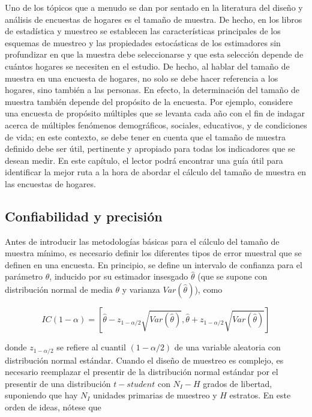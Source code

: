 \documentclass[
  12pt,
  spanish,
]{book}
\begin{document}
Uno de los tópicos que a menudo se dan por sentado en la literatura del diseño y análisis de encuestas de hogares es el tamaño de muestra. De hecho, en los libros de estadística y muestreo se establecen las características principales de los esquemas de muestreo y las propiedades estocásticas de los estimadores sin profundizar en que la muestra debe seleccionarse y que esta selección depende de cuántos hogares se necesiten en el estudio. De hecho, al hablar del tamaño de muestra en una encuesta de hogares, no solo se debe hacer referencia a los hogares, sino también a las personas. En efecto, la determinación del tamaño de muestra también depende del propósito de la encuesta. Por ejemplo, considere una encuesta de propósito múltiples que se levanta cada año con el fin de indagar acerca de múltiples fenómenos demográficos, sociales, educativos, y de condiciones de vida; en este contexto, se debe tener en cuenta que el tamaño de muestra definido debe ser útil, pertinente y apropiado para todas los indicadores que se desean medir. En este capítulo, el lector podrá encontrar una guía útil para identificar la mejor ruta a la hora de abordar el cálculo del tamaño de muestra en las encuestas de hogares.

\hypertarget{confiabilidad-y-precisiuxf3n}{%
\subsection*{Confiabilidad y precisión}\label{confiabilidad-y-precisiuxf3n}}

Antes de introducir las metodologías básicas para el cálculo del tamaño de muestra mínimo, es necesario definir los diferentes tipos de error muestral que se definen en una encuesta. En principio, se define un intervalo de confianza para el parámetro \(\theta\), inducido por su estimador insesgado \(\hat{\theta}\) (que se supone con distribución normal de media \(\theta\) y varianza \(Var(\hat{\theta})\)), como

\begin{equation}\label{ICtheta}
IC(1-\alpha)=\left[\hat{\theta}-z_{1-\alpha / 2}\sqrt{ Var(\hat{\theta})},\hat{\theta}+z_{1-\alpha / 2}\sqrt{Var(\hat{\theta})}\right]
\end{equation}

donde \(z_{1-\alpha / 2}\) se refiere al cuantil \((1-\alpha / 2)\) de una variable aleatoria con distribución normal estándar. Cuando el diseño de muestreo es complejo, es necesario reemplazar el presentir de la distribución normal estándar por el presentir de una distribución \(t-student\) con \(N_I - H\) grados de libertad, suponiendo que hay \(N_I\) unidades primarias de muestreo y \(H\) estratos. En este orden de ideas, nótese que
\end{document}
